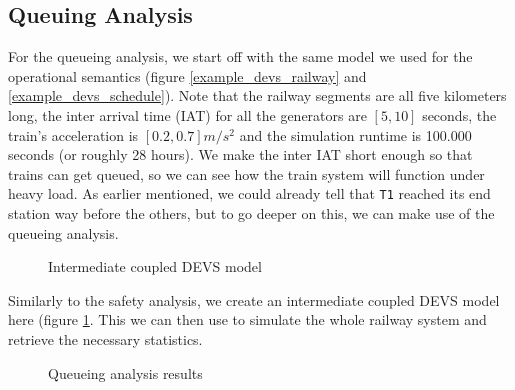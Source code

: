 \documentclass{article}
\begin{document}
\subsection*{Queuing Analysis}
\label{queueing_analysis_section}

For the queueing analysis, we start off with the same model we used for the operational semantics (figure \ref{example_devs_railway} and \ref{example_devs_schedule}). Note that the railway segments are all five kilometers long, the inter arrival time (IAT) for all the generators are $[5,10]$ seconds, the train's acceleration is $[0.2,0.7] m/s^2$ and the simulation runtime is 100.000 seconds (or roughly 28 hours). We make the inter IAT short enough so that trains can get queued, so we can see how the train system will function under heavy load. As earlier mentioned, we could already tell that \texttt{T1} reached its end station way before the others, but to go deeper on this, we can make use of the queueing analysis.

\begin{figure}[H]
    \begin{center}
    \end{center}
    \caption{Intermediate coupled DEVS model}
    \label{example_devs_devs}
\end{figure}

Similarly to the safety analysis, we create an intermediate coupled DEVS model here (figure \ref{example_devs_devs}. This we can then use to simulate the whole railway system and retrieve the necessary statistics.

\begin{figure}[H]
    \begin{center}
    \end{center}
    \caption{Queueing analysis results}
    \label{example_devs_results}
\end{figure}
\end{document}
